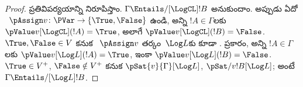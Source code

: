 \documentclass[../../../include/open-logic-section]{subfiles}
\begin{document}
\begin{proof}
  ప్రతివిపర్యయాన్ని నిరూపిస్తాం. $\Gamma \Entails/[\LogCL] !B$
  అనుకుందాం. అప్పుడు ఏదో ~$\pAssign v\colon \PVar \to
  \{\True, \False\}$ ఉండి, అన్ని $!A \in \Gamma$లకు
  $\pValue v[\LogCL](!A) = \True$, అలాగే
  $\pValue v[\LogCL](!B) = \False$. $\True,
  \False \in V$ కనుక ~$\pAssign v$
  తర్కం~$\Log L$కు కూడా .
   ప్రకారం, అన్ని $!A \in \Gamma$లకు
  $\pValue v[\Log L](!A) = \True$, ఇంకా
  $\pValue v[\Log L](!B) = \False$.
  $\True \in V^+$, $\False \notin V^+$ కనుక
  $\pSat{v}{\Gamma}[\Log L]$, $\pSat/{v}{!B}[\Log L]$;
  అంటే $\Gamma \Entails/[\Log L] !B$.
\end{proof}
\end{document}
